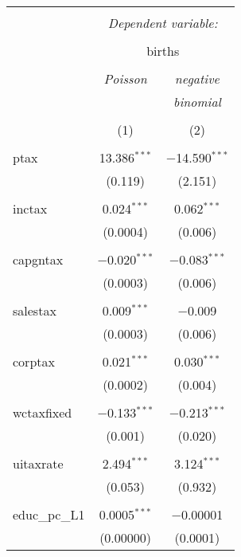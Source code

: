 
\begin{table}[!htbp] \centering 
  \caption{} 
  \label{} 
\begin{tabular}{@{\extracolsep{5pt}}lcc} 
\\[-1.8ex]\hline 
\hline \\[-1.8ex] 
 & \multicolumn{2}{c}{\textit{Dependent variable:}} \\ 
\cline{2-3} 
\\[-1.8ex] & \multicolumn{2}{c}{births} \\ 
\\[-1.8ex] & \textit{Poisson} & \textit{negative} \\ 
 & \textit{} & \textit{binomial} \\ 
\\[-1.8ex] & (1) & (2)\\ 
\hline \\[-1.8ex] 
 ptax & 13.386$^{***}$ & $-$14.590$^{***}$ \\ 
  & (0.119) & (2.151) \\ 
  & & \\ 
 inctax & 0.024$^{***}$ & 0.062$^{***}$ \\ 
  & (0.0004) & (0.006) \\ 
  & & \\ 
 capgntax & $-$0.020$^{***}$ & $-$0.083$^{***}$ \\ 
  & (0.0003) & (0.006) \\ 
  & & \\ 
 salestax & 0.009$^{***}$ & $-$0.009 \\ 
  & (0.0003) & (0.006) \\ 
  & & \\ 
 corptax & 0.021$^{***}$ & 0.030$^{***}$ \\ 
  & (0.0002) & (0.004) \\ 
  & & \\ 
 wctaxfixed & $-$0.133$^{***}$ & $-$0.213$^{***}$ \\ 
  & (0.001) & (0.020) \\ 
  & & \\ 
 uitaxrate & 2.494$^{***}$ & 3.124$^{***}$ \\ 
  & (0.053) & (0.932) \\ 
  & & \\ 
 educ\_pc\_L1 & 0.0005$^{***}$ & $-$0.00001 \\ 
  & (0.00000) & (0.0001) \\ 

\end{tabular}
\end{table}
